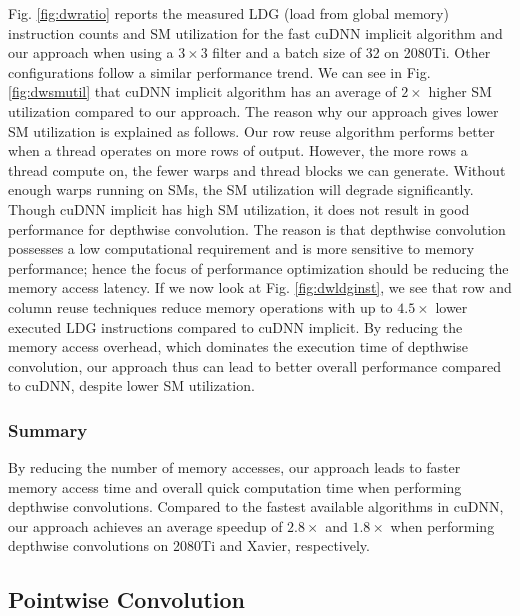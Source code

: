 Fig. \ref{fig:dwratio} reports the measured LDG (load from global memory) instruction counts and SM utilization for the fast cuDNN implicit
algorithm and our approach when using a $3 \times 3$ filter and a batch size of 32 on 2080Ti. Other configurations follow a similar
performance trend. We can see in Fig. \ref{fig:dwsmutil} that cuDNN implicit algorithm has an average of $2\times$ higher SM utilization
compared to our approach. The reason why our approach gives lower SM utilization is explained as follows. Our row reuse algorithm performs
better when a thread operates on more rows of output. However, the more rows a thread compute on, the fewer warps and thread blocks we can
generate. Without enough warps running on SMs, the SM utilization will degrade significantly. Though cuDNN implicit has high SM
utilization, it does not result in good performance for depthwise convolution. The reason is that depthwise convolution possesses a low
computational requirement and is more sensitive to memory performance; hence the focus of performance optimization should be reducing the
memory access latency.  If we now look at Fig. \ref{fig:dwldginst}, we see that row and column reuse techniques reduce memory operations
with up to $4.5\times$ lower executed LDG instructions compared to cuDNN implicit. By reducing the memory access overhead, which dominates
the execution time of depthwise convolution, our approach thus can lead to better overall performance compared to cuDNN, despite lower SM
utilization.

\subsubsection{Summary}
By reducing the number of memory accesses, our approach leads to faster memory access time and overall quick computation time when
performing depthwise convolutions. Compared to the fastest available algorithms in cuDNN, our approach achieves an average speedup of
$2.8\times$ and $1.8\times$ when performing depthwise convolutions on 2080Ti and Xavier, respectively.


\subsection{Pointwise Convolution}
\label{sec:pwconvexp}

